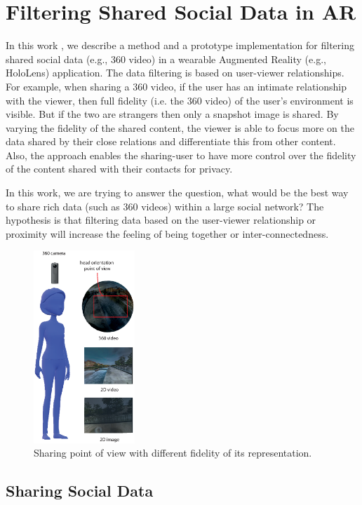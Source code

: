 \section{Filtering Shared Social Data in AR}
\label{sec:surrounding:360}

In this work \cite{Nassani2018a}, we describe a method and a prototype implementation for filtering shared social data (e.g., 360 video) in a wearable Augmented Reality (e.g., HoloLens) application. The data filtering is based on user-viewer relationships. For example, when sharing a 360 video, if the user has an intimate relationship with the viewer, then full fidelity (i.e. the 360 video) of the user's environment is visible. But if the two are strangers then only a snapshot image is shared. By varying the fidelity of the shared content, the viewer is able to focus more on the data shared by their close relations and differentiate this from other content. Also, the approach enables the sharing-user to have more control over the fidelity of the content shared with their contacts for privacy.

In this work, we are trying to answer the question, what would be the best way to share rich data (such as 360 videos) within a large social network? The hypothesis is that filtering data based on the user-viewer relationship or proximity will increase the feeling of being together or inter-connectedness. 

\begin{figure}[ht]
	\centering
	\includegraphics[width=1.5in]{images/chi/images-04.eps}
	\caption{Sharing point of view with different fidelity of its representation.}
	\label{fig:data:sharer}
\end{figure}

\subsection{Sharing Social Data}

